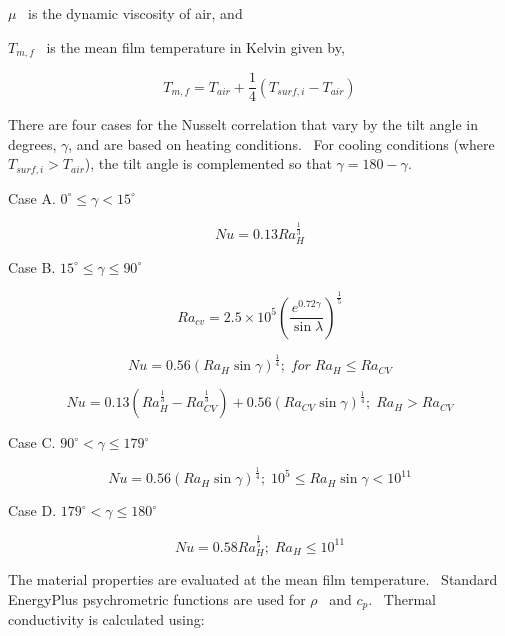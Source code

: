 \(\mu\) ~is the dynamic viscosity of air, and

\({T_{m,f}}\) ~is the mean film temperature in Kelvin given by,

\begin{equation}
{T_{m,f}} = {T_{air}} + \frac{1}{4}\left( {{T_{surf,i}} - {T_{air}}} \right)
\end{equation}

There are four cases for the Nusselt correlation that vary by the tilt angle in degrees, \(\gamma\), and are based on heating conditions.~ For cooling conditions (where \({T_{surf,i}} > {T_{air}}\)), the tilt angle is complemented so that \(\gamma = 180 - \gamma\).

Case A. \({0^\circ } \le \gamma < 15^\circ\)

\begin{equation}
Nu = 0.13Ra_H^{{\frac{1}{3}}}
\end{equation}

Case B. \(15^\circ \le \gamma \le 90^\circ\)

\begin{equation}
R{a_{cv}} = 2.5 \times {10^5}{\left( {\frac{{{e^{0.72\gamma }}}}{{\sin \lambda }}} \right)^{{\frac{1}{5}}}}
\end{equation}

\begin{equation}
Nu = 0.56{\left( {R{a_H}\sin \gamma } \right)^{{\frac{1}{4}}}};\;for\;R{a_H} \le R{a_{CV}}
\end{equation}

\begin{equation}
Nu = 0.13\left( {Ra_H^{{\frac{1}{3}}} - Ra_{CV}^{{\frac{1}{3}}}} \right) + 0.56{\left( {R{a_{CV}}\sin \gamma } \right)^{{\frac{1}{4}}}};\;R{a_H} > R{a_{CV}}
\end{equation}

Case C. \(90^\circ < \gamma \le 179^\circ\)

\begin{equation}
Nu = 0.56{\left( {R{a_H}\sin \gamma } \right)^{{\frac{1}{4}}}};\;{10^5} \le R{a_H}\sin \gamma  < {10^{11}}
\end{equation}

Case D. \(179^\circ < \gamma \le 180^\circ\)

\begin{equation}
Nu = 0.58Ra_H^{{\frac{1}{5}}};\;R{a_H} \le {10^{11}}
\end{equation}

The material properties are evaluated at the mean film temperature.~ Standard EnergyPlus psychrometric functions are used for \(\rho\) ~and \({c_p}\).~ Thermal conductivity is calculated using:


